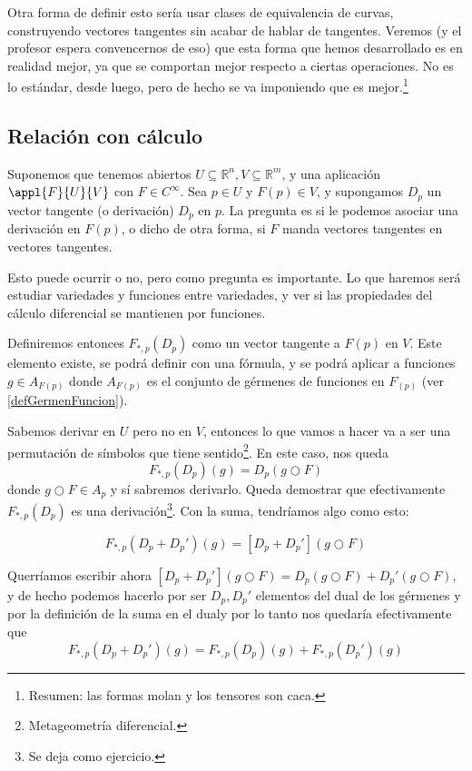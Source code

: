 \documentclass{apuntes}
\begin{document}
Otra forma de definir esto sería usar clases de equivalencia de curvas, construyendo vectores tangentes sin acabar de hablar de tangentes. Veremos (y el profesor espera convencernos de eso) que esta forma que hemos desarrollado es en realidad mejor, ya que se comportan mejor respecto a ciertas operaciones. No es lo estándar, desde luego, pero de hecho se va imponiendo que es mejor.\footnote{Resumen: las formas molan y los tensores son caca.}

\subsection{Relación con cálculo}

Suponemos que tenemos abiertos $U⊆ℝ^n, V⊆ℝ^m$, y una aplicación $\appl{F}{U}{V}$ con $F ∈ C^∞$. Sea $p ∈ U$ y $F(p) ∈ V$, y supongamos $D_p$ un vector tangente (o derivación) $D_p$ en $p$. La pregunta es si le podemos asociar una derivación en $F(p)$, o dicho de otra forma, si $F$ manda vectores tangentes en vectores tangentes.

Esto puede ocurrir o no, pero como pregunta es importante. Lo que haremos será estudiar variedades y funciones entre variedades, y ver si las propiedades del cálculo diferencial se mantienen por funciones.

Definiremos entonces $F_{*,p}(D_p)$ como un vector tangente a $F(p)$ en $V$. Este elemento existe, se podrá definir con una fórmula, y se podrá aplicar a funciones $g ∈ A_{F(p)}$ donde $A_{F(p)}$ es el conjunto de gérmenes de funciones en $F_{(p)}$ (ver \ref{defGermenFuncion}).

Sabemos derivar en $U$ pero no en $V$, entonces lo que vamos a hacer va a ser una permutación de símbolos que tiene sentido\footnote{Metageometría diferencial.}. En este caso, nos queda \[ F_{*,p}(D_p)(g) = D_p (g ○ F)\] donde $g ○ F ∈ A_p$ y sí sabremos derivarlo. Queda demostrar que efectivamente $F_{*,p}(D_p)$ es una derivación\footnote{Se deja como ejercicio.}. Con la suma, tendríamos algo como esto:

\[ F_{*,p}(D_p + D_p')(g) = [D_p + D_p'](g○F) \]

Querríamos escribir ahora  $[D_p + D_p'](g○F) = D_p (g○F) + D_p'(g○F)$, y de hecho podemos hacerlo por ser $D_p, D_p'$ elementos del dual de los gérmenes y por la definición de la suma en el dual\footnotemark y por lo tanto nos quedaría efectivamente que \[ F_{*,p}(D_p + D_p')(g) = F_{*,p}(D_p)(g) + F_{*,p}(D_p')(g) \]

\end{document}
